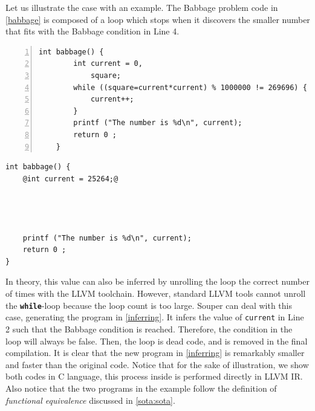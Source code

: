 Let us illustrate the case with an example.
The Babbage problem code in \autoref{babbage} is composed of a loop which stops when it discovers the smaller number that fits with the Babbage condition in Line 4.


{


\begin{minipage}[t]{0.5\linewidth}
    \begin{lstlisting}[numbers=left]
    int babbage() {
        int current = 0,
            square;
        while ((square=current*current) % 1000000 != 269696) {
            current++;
        }
        printf ("The number is %d\n", current);
        return 0 ;
    }
    \end{lstlisting}
\end{minipage}
\begin{minipage}[t]{0.5\linewidth}
    \begin{lstlisting}[]
int babbage() {
    @int current = 25264;@
    
    


    printf ("The number is %d\n", current);
    return 0 ;
}
    \end{lstlisting}
\end{minipage}
}
In theory, this value can also be inferred by unrolling the loop the correct number of times with the LLVM toolchain.
However, standard LLVM tools cannot unroll the \texttt{\textbf{while}}-loop because the loop count is too large.
Souper can deal with this case, generating the program in \autoref{inferring}. It infers the value of \texttt{current} in Line 2 such that the Babbage condition is reached. Therefore, the condition in the loop will always be false. Then, the loop is dead code, and is removed in the final compilation. It is clear that the new program in \autoref{inferring} is remarkably smaller and faster than the original code. Notice that for the sake of illustration, we show both codes in C language, this process inside is performed directly in LLVM IR. Also notice that the two programs in the example follow the definition of \emph{functional equivalence} discussed in \autoref{sota:sota}.

